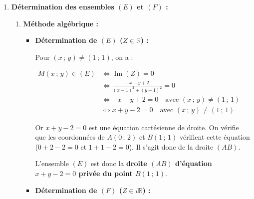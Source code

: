 \documentclass[12pt,a4paper]{article}
\begin{document}
\begin{enumerate}
    On obtient ainsi la forme algébrique de $Z$ pour $(x\,;\,y) \neq (1\,;\,1)$ :
    
    $
    \begin{aligned}
        Z &= \frac{x^2 + y^2 - x - 3y + 2}{(x - 1)^2 + (y - 1)^2} + i\frac{-x - y + 2}{(x - 1)^2 + (y - 1)^2}
    \end{aligned}
    $
    
    D'où :
    
    $
    \begin{aligned}
        \operatorname{Re}(Z) &= \mathbf{\frac{x^2 + y^2 - x - 3y + 2}{(x - 1)^2 + (y - 1)^2}} \quad \text{et} \quad \operatorname{Im}(Z) = \mathbf{\frac{-x - y + 2}{(x - 1)^2 + (y - 1)^2}}
    \end{aligned}
    $

    \item \textbf{Détermination des ensembles $(E)$ et $(F)$ :}
    
    \begin{enumerate}
        \item \textbf{Méthode algébrique :}
        
        \begin{itemize}
            \item \textbf{Détermination de $(E)$ ($Z \in \mathbb{R}$) :}
            
            Pour $(x\,;\,y) \neq (1\,;\,1)$, on a :
            
            $
            \begin{aligned}
                M(x\,;\,y) \in (E) &\iff \operatorname{Im}(Z) = 0\\
                &\iff \frac{-x - y + 2}{(x - 1)^2 + (y - 1)^2} = 0\\
                &\iff -x - y + 2 = 0 \quad \text{avec } (x\,;\,y) \neq (1\,;\,1)\\
                &\iff x + y - 2 = 0 \quad \text{avec } (x\,;\,y) \neq (1\,;\,1)
            \end{aligned}
            $
            
            Or $x + y - 2 = 0$ est une équation cartésienne de droite. On vérifie que les coordonnées de $A(0\,;\,2)$ et $B(1\,;\,1)$ vérifient cette équation ($0 + 2 - 2 = 0$ et $1 + 1 - 2 = 0$). Il s'agit donc de la droite $(AB)$.
            
            L'ensemble $(E)$ est donc la \textbf{droite $(AB)$ d'équation $x + y - 2 = 0$ privée du point $B(1\,;\,1)$}.

            \item \textbf{Détermination de $(F)$ ($Z \in i\mathbb{R}$) :}
            

\end{itemize}
\end{enumerate}
\end{enumerate}
\end{document}
